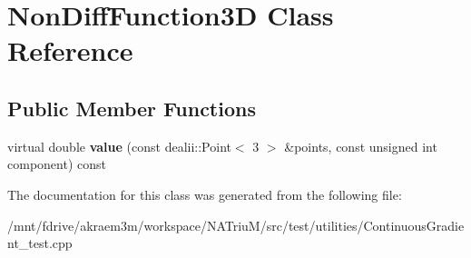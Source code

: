 \hypertarget{classNonDiffFunction3D}{
\section{NonDiffFunction3D Class Reference}
\label{classNonDiffFunction3D}
}
\subsection*{Public Member Functions}
\begin{DoxyCompactItemize}
\item 
\hypertarget{classNonDiffFunction3D_a7d1e367bdbdb48b677ee3c4cc04b9ab6}{
virtual double {\bfseries value} (const dealii::Point$<$ 3 $>$ \&points, const unsigned int component) const }
\label{classNonDiffFunction3D_a7d1e367bdbdb48b677ee3c4cc04b9ab6}

\end{DoxyCompactItemize}


The documentation for this class was generated from the following file:\begin{DoxyCompactItemize}
\item 
/mnt/fdrive/akraem3m/workspace/NATriuM/src/test/utilities/ContinuousGradient\_\-test.cpp\end{DoxyCompactItemize}
